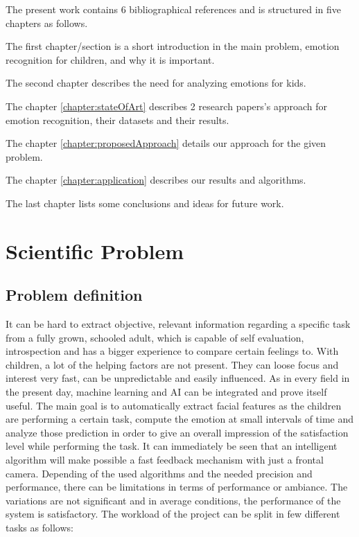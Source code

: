 \documentclass[runningheads,a4paper,11pt]{report}
\begin{document}
The present work contains 6 bibliographical references and is structured in five chapters as follows.

The first chapter/section is a short introduction in the main problem, emotion recognition for children, and why it is important.

The second chapter describes the need for analyzing emotions for kids.

The chapter \ref{chapter:stateOfArt} describes 2 research papers's approach for emotion recognition, their datasets and their results.

The chapter \ref{chapter:proposedApproach} details our approach for the given problem.

The chapter  \ref{chapter:application} describes our results and algorithms.

The last chapter lists some conclusions and ideas for future work.


\chapter{Scientific Problem}
\label{section:scientificProblem}


\section{Problem definition}
\label{section:problemDefinition}

    It can be hard to extract objective, relevant information regarding a specific task from a fully grown, schooled adult, which is capable of self evaluation, introspection and has a bigger experience to compare certain feelings to. With children, a lot of the helping factors are not present. They can loose focus and interest very fast, can be unpredictable and easily influenced. As in every field in the present day, machine learning and AI can be integrated and prove itself useful. The main goal is to automatically extract facial features as the children are performing a certain task, compute the emotion at small intervals of time and analyze those prediction in order to give an overall impression of the satisfaction level while performing the task.
    It can immediately be seen that an intelligent algorithm will make possible a fast feedback mechanism with just a frontal camera. Depending of the used algorithms and the needed precision and performance, there can be limitations in terms of performance or ambiance. The variations are not significant and in average conditions, the performance of the system is satisfactory.
    The workload of the project can be split in few different tasks as follows:
\end{document}
